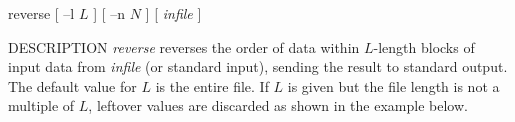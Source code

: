 % 
% 
% 
% 
%                                                                        
%
\hypertarget{reverse}{}

\begin{synopsis}
\item[reverse] [ --l $L$ ] [ --n $N$ ] [ {\em infile} ]
\end{synopsis}

\begin{qsection}{DESCRIPTION}
{\em reverse} reverses the order of data within $L$-length blocks 
of input data from {\em infile} (or standard input), 
sending the result to standard output. 
The default value for $L$ is the entire file. 
If $L$ is given but the file length is not a multiple of $L$, 
leftover values are discarded as shown in the example below.
\end{qsection}

